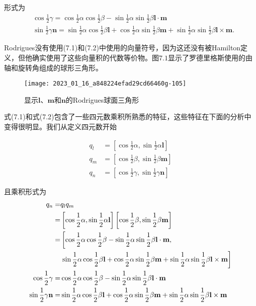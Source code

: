形式为
\begin{align}
& \cos \frac{1}{2} \gamma=\cos \frac{1}{2} \alpha \cos \frac{1}{2} \beta-\sin \frac{1}{2} \alpha \sin \frac{1}{2} \beta \mathbf{l} \cdot \mathbf{m} \\
& \sin \frac{1}{2} \gamma \mathbf{n}=\sin \frac{1}{2} \alpha \cos \frac{1}{2} \beta \mathbf{l}+\cos \frac{1}{2} \alpha \sin \frac{1}{2} \beta \mathbf{m}+\sin \frac{1}{2} \alpha \sin \frac{1}{2} \beta \mathbf{l} \times \mathbf{m} .
\end{align}

Rodrigues没有使用(7.1)和(7.2)中使用的向量符号，因为这还没有被Hamilton定义，但他确实使用了这些向量积的代数等价物。图$7.1$显示了罗德里格斯使用的由轴和旋转角组成的球形三角形。

\begin{figure}[h!]
    \centering
    \texttt{[image: 2023\_01\_16\_a848224efad29cd66460g-105]}
    \caption[short]{显示$\mathbf{l}$、$\mathbf{m}$和$\mathbf{n}$的Rodrigues球面三角形}
\end{figure}

式(7.1)和式(7.2)包含了一些四元数乘积所熟悉的特征，这些特征在下面的分析中变得很明显。我们从定义四元数开始

$$
\begin{aligned}
q_{l} & =\left[\cos \frac{1}{2} \alpha, \sin \frac{1}{2} \alpha \mathbf{l}\right] \\
q_{m} & =\left[\cos \frac{1}{2} \beta, \sin \frac{1}{2} \beta \mathbf{m}\right] \\
q_{n} & =\left[\cos \frac{1}{2} \gamma, \sin \frac{1}{2} \gamma \mathbf{n}\right]
\end{aligned}
$$

且乘积形式为
\begin{align}
q_{n}  =& q_{l} q_{m} \notag\\
=& \left[\cos \frac{1}{2} \alpha, \sin \frac{1}{2} \alpha \mathbf{l}\right]\left[\cos \frac{1}{2} \beta, \sin \frac{1}{2} \beta \mathbf{m}\right] \notag\\
=& \left[\cos \frac{1}{2} \alpha \cos \frac{1}{2} \beta-\sin \frac{1}{2} \alpha \sin \frac{1}{2} \beta \mathbf{l} \cdot \mathbf{m},\right. \notag\\
& \left.\sin \frac{1}{2} \alpha \cos \frac{1}{2} \beta \mathbf{l}+\cos \frac{1}{2} \alpha \sin \frac{1}{2} \beta \mathbf{m}+\sin \frac{1}{2} \alpha \sin \frac{1}{2} \beta \mathbf{l} \times \mathbf{m}\right] \notag\\
\cos \frac{1}{2} \gamma = & \cos \frac{1}{2} \alpha \cos \frac{1}{2} \beta-\sin \frac{1}{2} \alpha \sin \frac{1}{2} \beta \mathbf{l} \cdot \mathbf{m} \\
\sin \frac{1}{2} \gamma \mathbf{n} =& \sin \frac{1}{2} \alpha \cos \frac{1}{2} \beta \mathbf{l}+\cos \frac{1}{2} \alpha \sin \frac{1}{2} \beta \mathbf{m}+\sin \frac{1}{2} \alpha \sin \frac{1}{2} \beta \mathbf{l} \times \mathbf{m}
\end{align}

